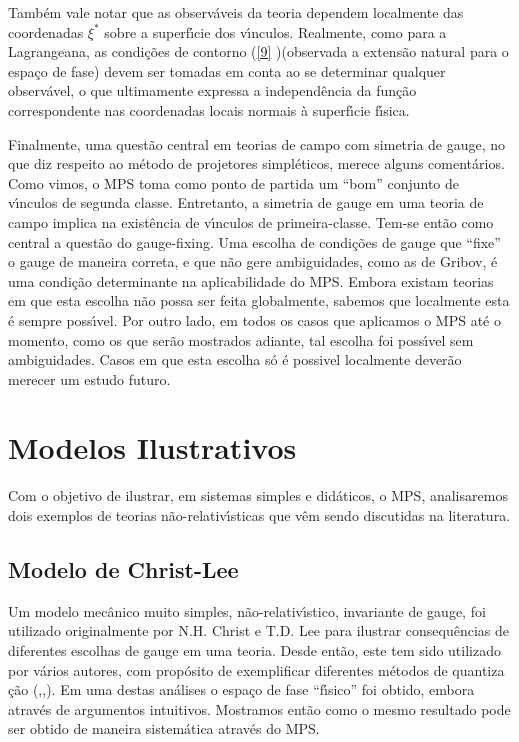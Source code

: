 \documentclass[a4paper,thmsa,12pt]{report}
\begin{document}
Tamb\'{e}m vale notar que as observ\'{a}veis da teoria dependem localmente
das coordenadas $\xi ^{\ast }$ sobre a superf\'{\i}cie dos v\'{\i}nculos.
Realmente, como para a Lagrangeana, as condi\c{c}\~{o}es de contorno (\ref{9}%
)(observada a extens\~{a}o natural para o espa\c{c}o de fase) devem ser
tomadas em conta ao se determinar qualquer observ\'{a}vel, o que ultimamente
expressa a independ\^{e}ncia da fun\c{c}\~{a}o correspondente nas
coordenadas locais normais \`{a} superf\'{\i}cie f\'{\i}sica.

Finalmente, uma quest\~{a}o central em teorias de campo com simetria de
gauge, no que diz respeito ao m\'{e}todo de projetores simpl\'{e}ticos,
merece alguns coment\'{a}rios. Como vimos, o MPS toma como ponto de partida
um ``bom'' conjunto de v\'{\i}nculos de segunda classe. Entretanto, a
simetria de gauge em uma teoria de campo implica na exist\^{e}ncia de
v\'{\i}nculos de primeira-classe. Tem-se ent\~{a}o como central a
quest\~{a}o do gauge-fixing. Uma escolha de condi\c{c}\~{o}es de gauge que
``fixe'' o gauge de maneira correta, e que n\~{a}o gere ambiguidades, como
as de Gribov, \'{e} uma condi\c{c}\~{a}o determinante na aplicabilidade do
MPS. Embora existam teorias em que esta escolha n\~{a}o possa ser feita
globalmente, sabemos que localmente esta \'{e} sempre poss\'{\i}vel. Por
outro lado, em todos os casos que aplicamos o MPS at\'{e} o momento, como os
que ser\~{a}o mostrados adiante, tal escolha foi poss\'{\i}vel sem
ambiguidades. Casos em que esta escolha s\'{o} \'{e} possivel localmente
dever\~{a}o merecer um estudo futuro.

\chapter{{\sc Modelos Ilustrativos}}

Com o objetivo de ilustrar, em sistemas simples e did\'{a}ticos, o MPS,
analisaremos dois exemplos de teorias n\~{a}o-relativ\'{\i}sticas que
v\^{e}m sendo discutidas na literatura.

\section{{\sc Modelo de Christ-Lee}}

Um modelo mec\^{a}nico muito simples, n\~{a}o-relativ\'{\i}stico, invariante
de gauge, foi utilizado originalmente por N.H. Christ e T.D. Lee\cite
{christ-lee} para ilustrar consequ\^{e}ncias de diferentes escolhas de gauge
em uma teoria. Desde ent\~{a}o, este tem sido utilizado por v\'{a}rios
autores, com prop\'{o}sito de exemplificar diferentes m\'{e}todos de quantiza%
\c{c}\~{a}o (\cite{costa-girotti},\cite{phokhorov},\cite{bouzas}). Em uma
destas an\'{a}lises \cite{costa-girotti} o espa\c{c}o de fase
``f\'{\i}sico'' foi obtido, embora atrav\'{e}s de argumentos intuitivos.
Mostramos ent\~{a}o \cite{c-lee} como o mesmo resultado pode ser obtido de
maneira sistem\'{a}tica atrav\'{e}s do MPS.
\end{document}
